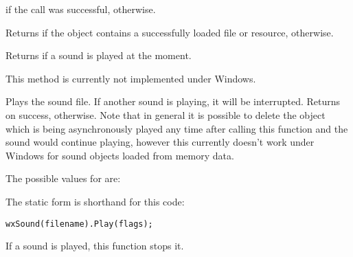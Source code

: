 

\true if the call was successful, \false otherwise.


\label{wxsoundisok}


Returns \true if the object contains a successfully loaded file or resource, \false otherwise.


\label{wxsoundisplaying}


Returns \true if a sound is played at the moment.

This method is currently not implemented under Windows.


\label{wxsoundplay}



Plays the sound file. If another sound is playing, it will be interrupted.
Returns \true on success, \false otherwise. Note that in general it is possible
to delete the object which is being asynchronously played any time after
calling this function and the sound would continue playing, however this
currently doesn't work under Windows for sound objects loaded from memory data.

The possible values for  are:

\begin{twocollist}
\end{twocollist}

The static form is shorthand for this code:

\begin{verbatim}
wxSound(filename).Play(flags);
\end{verbatim}


\label{wxsoundstop}


If a sound is played, this function stops it.

